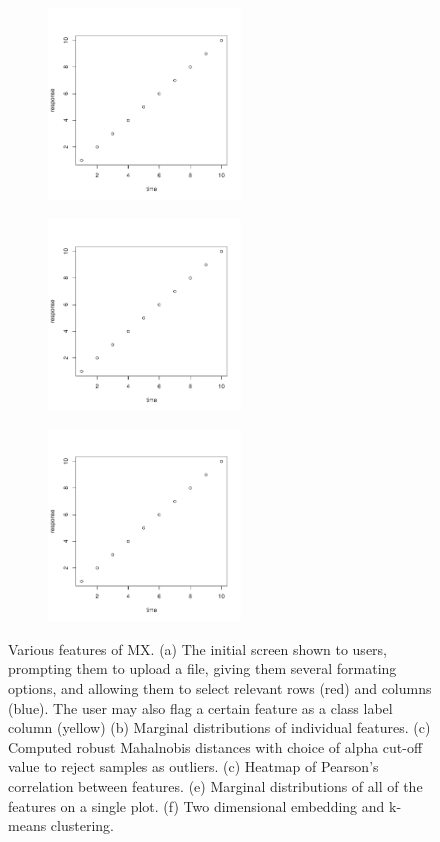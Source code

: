 \documentclass[12pt]{article}
\begin{document}
\begin{figure}
	\begin{subfigure}[b]{0.45\textwidth}
		\includegraphics[width=\textwidth, height = 2in]{fig1.pdf}
		\subcaption{}
		\label{fig:FigCorrelation}
	\end{subfigure}
	\begin{subfigure}[b]{0.45\textwidth}
		\includegraphics[width=\textwidth, height = 2in]{fig1.pdf}
		\subcaption{}
		\label{fig:FigFeature}
	\end{subfigure}\hfill
	\begin{subfigure}[b]{0.45\textwidth}
		\includegraphics[width=\textwidth, height = 2in]{fig1.pdf}
		\subcaption{}
		\label{fig:FigEmbedding}
	\end{subfigure}
	\caption{Various features of MX. (a) The initial screen shown to users, prompting them to upload a file, giving them several formating options, and allowing them to select relevant rows (red) and columns (blue). The user may also flag a certain feature as a class label column (yellow) (b) Marginal distributions of individual features. (c) Computed robust Mahalnobis distances with choice of alpha cut-off value to reject samples as outliers. (c) Heatmap of Pearson's correlation between features. (e) Marginal distributions of all of the features on a single plot. (f) Two dimensional embedding and k-means clustering.}
\end{figure}
\end{document}
